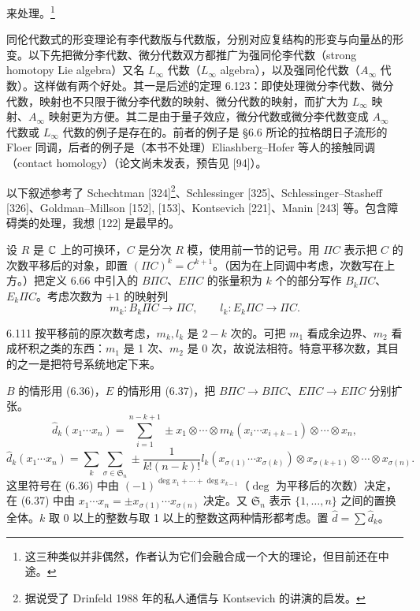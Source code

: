 来处理。\footnote{这三种类似并非偶然，作者认为它们会融合成一个大的理论，但目前还在中途。}

同伦代数式的形变理论有李代数版与代数版，分别对应复结构的形变与向量丛的形变。以下先把微分李代数、微分代数双方都推广为强同伦李代数（strong homotopy Lie algebra）又名 $L_{\infty}$ 代数（$L_{\infty}$ algebra），以及强同伦代数（$A_{\infty}$ 代数）。这样做有两个好处。其一是后述的定理 6.123：即使处理微分李代数、微分代数，映射也不只限于微分李代数的映射、微分代数的映射，而扩大为 $L_{\infty}$ 映射、$A_{\infty}$ 映射更为方便。其二是由于量子效应，微分代数或微分李代数变成 $A_{\infty}$ 代数或 $L_{\infty}$ 代数的例子是存在的。前者的例子是 §6.6 所论的拉格朗日子流形的 Floer 同调，后者的例子是（本书不处理）Eliashberg–Hofer 等人的接触同调（contact homology）（论文尚未发表，预告见 [94]）。

以下叙述参考了 Schechtman [324]\footnote{据说受了 Drinfeld 1988 年的私人通信与 Kontsevich 的讲演的启发。}、Schlessinger [325]、Schlessinger–Stasheff [326]、Goldman–Millson [152], [153]、Kontsevich [221]、Manin [243] 等。包含障碍类的处理，我想 [122] 是最早的。

设 $R$ 是 $\mathbb{C}$ 上的可换环，$C$ 是分次 $R$ 模，使用前一节的记号。用 $\Pi C$ 表示把 $C$ 的次数平移后的对象，即置 $(\Pi C)^k=C^{k+1}$。（因为在上同调中考虑，次数写在上方。）把定义 6.66 中引入的 $B\Pi C$、$E\Pi C$ 的张量积为 $k$ 个的部分写作 $B_k\Pi C$、$E_k\Pi C$。考虑次数为 $+1$ 的映射列
\[
  m_k\colon B_k\Pi C\to\Pi C,\qquad l_k\colon E_k\Pi C\to\Pi C.
\]

\begin{remark}{6.111}
  按平移前的原次数考虑，$m_k,l_k$ 是 $2-k$ 次的。可把 $m_1$ 看成余边界、$m_2$ 看成杯积之类的东西：$m_1$ 是 1 次、$m_2$ 是 0 次，故说法相符。特意平移次数，其目的之一是把符号系统地定下来。
\end{remark}

$B$ 的情形用 (6.36)，$E$ 的情形用 (6.37)，把 $B\Pi C\to B\Pi C$、$E\Pi C\to E\Pi C$ 分别扩张。
\begin{equation}
  \hat d_k(x_1\cdots x_n)=\sum_{i=1}^{n-k+1}\pm x_1\otimes\cdots\otimes m_k(x_i\cdots x_{i+k-1})\otimes\cdots\otimes x_n, \tag{6.36}
\end{equation}
\begin{equation}
  \hat d_k(x_1\cdots x_n)=\sum_k\sum_{\sigma\in\mathfrak{S}_n}\pm\frac{1}{k!(n-k)!}
  l_k(x_{\sigma(1)}\cdots x_{\sigma(k)})\otimes x_{\sigma(k+1)}\otimes\cdots\otimes x_{\sigma(n)}. \tag{6.37}
\end{equation}
这里符号在 (6.36) 中由 $(-1)^{\deg x_1+\cdots+\deg x_{k-1}}$（$\deg$ 为平移后的次数）决定，在 (6.37) 中由 $x_1\cdots x_n=\pm x_{\sigma(1)}\cdots x_{\sigma(n)}$ 决定。又 $\mathfrak{S}_n$ 表示 $\{1,\dots,n\}$ 之间的置换全体。$k$ 取 0 以上的整数与取 1 以上的整数这两种情形都考虑。置 $\hat d=\sum\hat d_k$。

